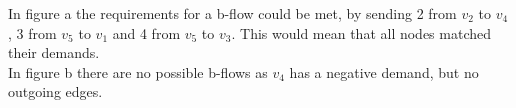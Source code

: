 In figure a the requirements for a b-flow could be met, by sending 2 from
$v_2$ to $v_4$, 3 from $v_5$ to $v_1$ and 4 from $v_5$ to $v_3$. This
would mean that all nodes matched their demands. \\
In figure b there are no possible b-flows as $v_4$ has a negative demand,
but no outgoing edges.
